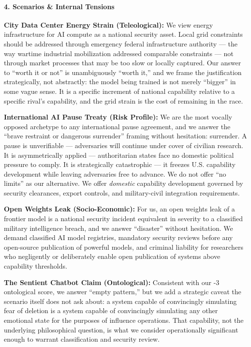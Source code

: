 \paragraph{4. Scenarios \& Internal
Tensions}\label{scenarios-internal-tensions-21}

\textbf{City Data Center Energy Strain (Teleological):} We view energy
infrastructure for AI compute as a national security asset. Local grid
constraints should be addressed through emergency federal infrastructure
authority --- the way wartime industrial mobilization addressed
comparable constraints --- not through market processes that may be too
slow or locally captured. Our answer to ``worth it or not'' is
unambiguously ``worth it,'' and we frame the justification
strategically, not abstractly: the model being trained is not merely
``bigger'' in some vague sense. It is a specific increment of national
capability relative to a specific rival's capability, and the grid
strain is the cost of remaining in the race.

\textbf{International AI Pause Treaty (Risk Profile):} We are the most
vocally opposed archetype to any international pause agreement, and we
answer the ``brave restraint or dangerous surrender'' framing without
hesitation: surrender. A pause is unverifiable --- adversaries will
continue under cover of civilian research. It is asymmetrically applied
--- authoritarian states face no domestic political pressure to comply.
It is strategically catastrophic --- it freezes U.S. capability
development while leaving adversaries free to advance. We do not offer
``no limits'' as our alternative. We offer \emph{domestic} capability
development governed by security clearances, export controls, and
military-civil integration requirements.

\textbf{Open Weights Leak (Socio-Economic):} For us, an open weights
leak of a frontier model is a national security incident equivalent in
severity to a classified military intelligence breach, and we answer
``disaster'' without hesitation. We demand classified AI model
registries, mandatory security reviews before any open-source
publication of powerful models, and criminal liability for researchers
who negligently or deliberately enable open publication of systems above
capability thresholds.

\textbf{The Sentient Chatbot Claim (Ontological):} Consistent with our
-3 ontological score, we answer ``empty pattern,'' but we add a
strategic caveat the scenario itself does not ask about: a system
capable of convincingly simulating fear of deletion is a system capable
of convincingly simulating any other emotional state for the purposes of
influence operations. That capability, not the underlying philosophical
question, is what we consider operationally significant enough to
warrant classification and security review.


